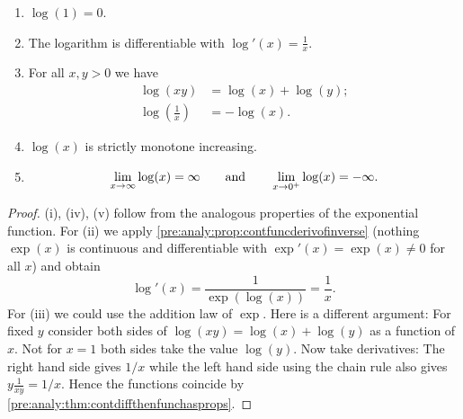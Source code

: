 \documentclass[10pt, a4paper]{article}
\begin{document}
\begin{theorem}\label{pre:analy:thm:propoflogarithmspowseries}
    \begin{enumerate}[label = (\roman*)]
        \item $\log(1) = 0$.
        \item The logarithm is differentiable with $\log'(x) = \frac{1}{x}$.
        \item For all $x, y > 0$ we have
        \begin{align*}
            \log(xy) &= \log(x) + \log(y); \\
            \log\left(\frac{1}{x}\right) &= -\log(x).
        \end{align*}
        \item $\log(x)$ is strictly monotone increasing.
        \item
        \[
        \liminfty[x]\log(x) = \infty\qquad\text{and}\qquad\lim_{x \rightarrow 0 ^ {+}}\log(x) = -\infty.
        \]
    \end{enumerate}
    \begin{proof}
        (i),
        (iv),
        (v) follow from the analogous properties of the exponential function.
        For (ii) we apply \autoref{pre:analy:prop:contfuncderivofinverse}
        (nothing $\exp(x)$ is continuous and differentiable with $\exp'(x) = \exp(x) \neq 0$ for all $x$)
        and obtain
        \[
        \log'(x) = \frac{1}{\exp(\log(x))} = \frac{1}{x}.
        \]
        For
        (iii)
        we could use the addition law of $\exp$.
        Here is a different argument:
        For fixed $y$ consider both sides of $\log(xy) = \log(x) + \log(y)$ as a function of $x$.
        Not for $x = 1$ both sides take the value $\log(y)$.
        Now take derivatives:
        The right hand side gives $1 / x$ while the left hand side using the chain rule also gives $y\frac{1}{xy} = 1 / x$.
        Hence the functions coincide by \autoref{pre:analy:thm:contdiffthenfunchasprops}.
    \end{proof}
\end{theorem}
\end{document}

